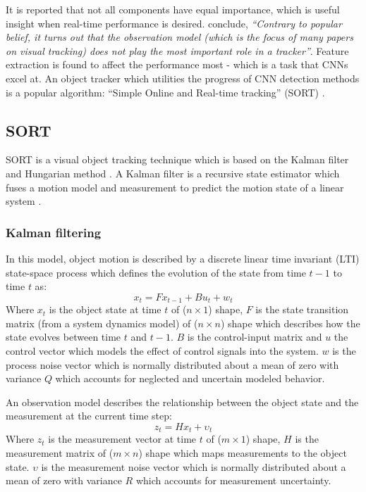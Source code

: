 \documentclass[a4paper,twoside,12pt]{report}
\begin{document}
It is reported that not all components have equal importance, which is useful insight when real-time performance is desired. \cite{diagnosingtrack} conclude, \textit{``Contrary to popular belief, it turns out that the observation model (which is the focus of many papers on visual tracking) does not play the most important role in a tracker''}. Feature extraction is found to affect the performance most - which is a task that CNNs excel at. An object tracker which utilities the progress of CNN detection methods is a popular algorithm: ``Simple Online and Real-time tracking'' (SORT) \citep{sort}.

\subsection{SORT}

SORT is a visual object tracking technique which is based on the Kalman filter \citep{kalman} and Hungarian method \citep{hungarian}. A Kalman filter is a recursive state estimator which fuses a motion model and measurement to predict the motion state of a linear system \citep{trackbook}. 

\subsubsection{Kalman filtering}

In this model, object motion is described by a discrete linear time invariant (LTI) state-space process which defines the evolution of the state from time $t-1$ to time $t$ as:
\begin{equation} 
x_t=Fx_{t-1}+Bu_{t}+w_{t}
\end{equation}
Where $x_{t}$ is the object state at time $t$ of ($n \times 1$) shape, $F$ is the state transition matrix (from a system dynamics model) of ($n \times n$) shape which describes how the state evolves between time $t$ and $t-1$. $B$ is the control-input matrix and $u$ the control vector which models the effect of control signals into the system. $w$ is the process noise vector which is normally distributed about a mean of zero with variance $Q$ which accounts for neglected and uncertain modeled behavior.

An observation model describes the relationship between the object state and the measurement at the current time step:
\begin{equation} 
z_t=Hx_{t}+{\upsilon}_t
\end{equation}
Where $z_{t}$ is the measurement vector at time $t$ of ($m \times 1$) shape, $H$ is the measurement matrix of ($m \times n$) shape which maps measurements to the object state. $\upsilon$ is the measurement noise vector which is normally distributed about a mean of zero with variance $R$ which accounts for measurement uncertainty.
\end{document}
